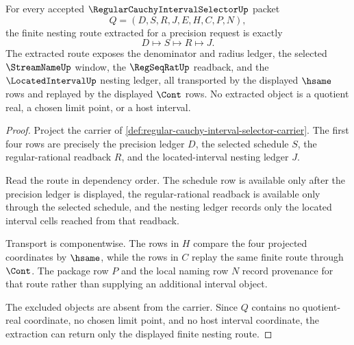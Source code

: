\begin{theorem}
\label{thm:regular-cauchy-interval-selector-nesting-extraction}
For every accepted $\RegularCauchyIntervalSelectorUp$ packet
$$
Q=(D,S,R,J,E,H,C,P,N),
$$
the finite nesting route extracted for a precision request is exactly
$$
D \longmapsto S \longmapsto R \longmapsto J.
$$
The extracted route exposes the denominator and radius ledger, the selected $\StreamNameUp$ window, the $\RegSeqRatUp$ readback, and the $\LocatedIntervalUp$ nesting ledger, all transported by the displayed $\hsame$ rows and replayed by the displayed $\Cont$ rows. No extracted object is a quotient real, a chosen limit point, or a host interval.
\end{theorem}
\begin{proof}
Project the carrier of \autoref{def:regular-cauchy-interval-selector-carrier}. The first four rows are precisely the precision ledger $D$, the selected schedule $S$, the regular-rational readback $R$, and the located-interval nesting ledger $J$.

Read the route in dependency order. The schedule row is available only after the precision ledger is displayed, the regular-rational readback is available only through the selected schedule, and the nesting ledger records only the located interval cells reached from that readback.

Transport is componentwise. The rows in $H$ compare the four projected coordinates by $\hsame$, while the rows in $C$ replay the same finite route through $\Cont$. The package row $P$ and the local naming row $N$ record provenance for that route rather than supplying an additional interval object.

The excluded objects are absent from the carrier. Since $Q$ contains no quotient-real coordinate, no chosen limit point, and no host interval coordinate, the extraction can return only the displayed finite nesting route.
\end{proof}

